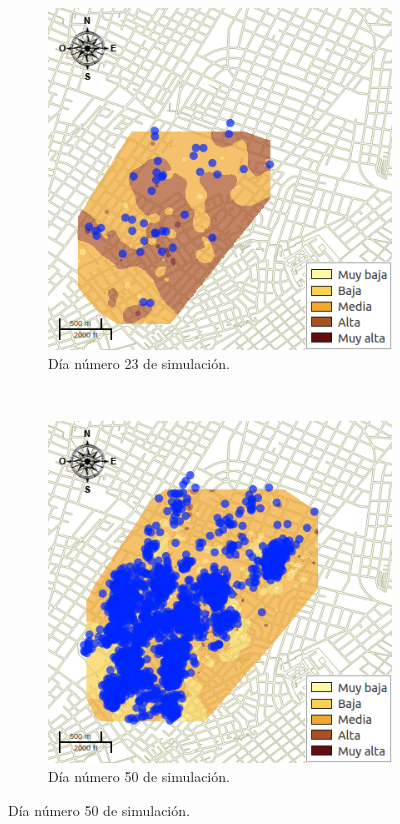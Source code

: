 \begin{figure}[!htbp]
    \begin{subfigure}[b]{0.45\textwidth}
            \includegraphics[width=\textwidth]{capitulo-6/graphics/raster/temp-27-22.png}
            \caption{\label{fig:niveles-infestacion-27-c}Día número 23 de simulación.}
    \end{subfigure}
    ~~
    \begin{subfigure}[b]{0.45\textwidth}
            \includegraphics[width=\textwidth]{capitulo-6/graphics/raster/temp-27-49.png}
            \caption{\label{fig:niveles-infestacion-27-d}Día número 50 de simulación.}
    \end{subfigure}


\end{figure}
